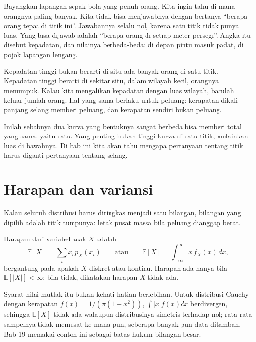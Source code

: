 \begin{untukanak}
Bayangkan lapangan sepak bola yang penuh orang. Kita ingin tahu di mana orangnya
paling banyak. Kita tidak bisa menjawabnya dengan bertanya ``berapa orang tepat di
titik ini''. Jawabannya selalu nol, karena satu titik tidak punya luas. Yang bisa
dijawab adalah ``berapa orang di setiap meter persegi''. Angka itu disebut kepadatan,
dan nilainya berbeda-beda: di depan pintu masuk padat, di pojok lapangan lengang.

Kepadatan tinggi bukan berarti di situ ada banyak orang di satu titik. Kepadatan
tinggi berarti di sekitar situ, dalam wilayah kecil, orangnya menumpuk. Kalau kita
mengalikan kepadatan dengan luas wilayah, barulah keluar jumlah orang. Hal yang sama
berlaku untuk peluang: kerapatan dikali panjang selang memberi peluang, dan kerapatan
sendiri bukan peluang.

Inilah sebabnya dua kurva yang bentuknya sangat berbeda bisa memberi total yang sama,
yaitu satu. Yang penting bukan tinggi kurva di satu titik, melainkan luas di bawahnya.
Di bab ini kita akan tahu mengapa pertanyaan tentang titik harus diganti pertanyaan
tentang selang.
\end{untukanak}

\section{Harapan dan variansi}

Kalau seluruh distribusi harus diringkas menjadi satu bilangan, bilangan yang dipilih
adalah titik tumpunya: letak pusat massa bila peluang dianggap berat.

\begin{definisi}[Harapan]
Harapan dari variabel acak $X$ adalah
\[
\mathbb{E}[X]=\sum_i x_i\,p_X(x_i)
\qquad\text{atau}\qquad
\mathbb{E}[X]=\int_{-\infty}^{\infty}x\,f_X(x)\,dx,
\]
bergantung pada apakah $X$ diskret atau kontinu. Harapan ada hanya bila
$\mathbb{E}[|X|]<\infty$; bila tidak, dikatakan harapan $X$ tidak ada.
\end{definisi}

Syarat nilai mutlak itu bukan kehati-hatian berlebihan. Untuk distribusi Cauchy dengan
kerapatan $f(x)=1/(\pi(1+x^2))$, $\int|x|f(x)dx$ berdivergen, sehingga $\mathbb{E}[X]$
tidak ada walaupun distribusinya simetris terhadap nol; rata-rata sampelnya tidak
memusat ke mana pun, seberapa banyak pun data ditambah. Bab 19 memakai contoh ini
sebagai batas hukum bilangan besar.


